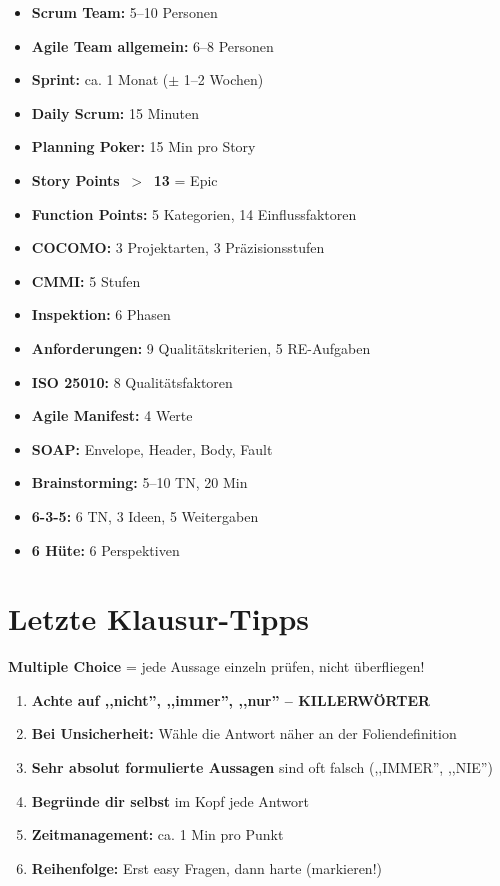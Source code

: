 \documentclass[11pt,a4paper]{article}
\begin{document}
\begin{keyfacts}
\begin{itemize}
  \item \textbf{Scrum Team:} 5--10 Personen
  \item \textbf{Agile Team allgemein:} 6--8 Personen
  \item \textbf{Sprint:} ca. 1 Monat ($\pm$ 1--2 Wochen)
  \item \textbf{Daily Scrum:} 15 Minuten
  \item \textbf{Planning Poker:} 15 Min pro Story
  \item \textbf{Story Points \,$>$\, 13} = Epic
  \item \textbf{Function Points:} 5 Kategorien, 14 Einflussfaktoren
  \item \textbf{COCOMO:} 3 Projektarten, 3 Präzisionsstufen
  \item \textbf{CMMI:} 5 Stufen
  \item \textbf{Inspektion:} 6 Phasen
  \item \textbf{Anforderungen:} 9 Qualitätskriterien, 5 RE-Aufgaben
  \item \textbf{ISO 25010:} 8 Qualitätsfaktoren
  \item \textbf{Agile Manifest:} 4 Werte
  \item \textbf{SOAP:} Envelope, Header, Body, Fault
  \item \textbf{Brainstorming:} 5--10 TN, 20 Min
  \item \textbf{6-3-5:} 6 TN, 3 Ideen, 5 Weitergaben
  \item \textbf{6 Hüte:} 6 Perspektiven
\end{itemize}
\end{keyfacts}

\newpage
\section{Letzte Klausur-Tipps}

\begin{tldr}
\textbf{Multiple Choice} = jede Aussage einzeln prüfen, nicht überfliegen!
\end{tldr}

\begin{keyfacts}
\begin{enumerate}
  \item \textbf{Achte auf ,,nicht'', ,,immer'', ,,nur'' -- KILLERWÖRTER}
  \item \textbf{Bei Unsicherheit:} Wähle die Antwort näher an der Foliendefinition
  \item \textbf{Sehr absolut formulierte Aussagen} sind oft falsch (,,IMMER'', ,,NIE'')
  \item \textbf{Begründe dir selbst} im Kopf jede Antwort
  \item \textbf{Zeitmanagement:} ca. 1 Min pro Punkt
  \item \textbf{Reihenfolge:} Erst easy Fragen, dann harte (markieren!)
\end{enumerate}
\end{keyfacts}
\end{document}
